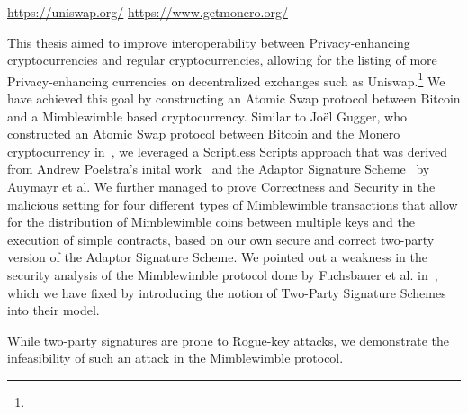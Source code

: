 \urldef{\urluniswp}\url{https://uniswap.org/}
\urldef{\urlmonero}\url{https://www.getmonero.org/}

This thesis aimed to improve interoperability between Privacy-enhancing cryptocurrencies and regular cryptocurrencies, allowing for the listing of more Privacy-enhancing currencies on decentralized exchanges such as Uniswap.\footnote{\urluniswp}
We have achieved this goal by constructing an Atomic Swap protocol between Bitcoin and a Mimblewimble based cryptocurrency.
Similar to Joël Gugger, who constructed an Atomic Swap protocol between Bitcoin and the Monero cryptocurrency in~\cite{gugger2020bitcoin}, we leveraged a Scriptless Scripts approach that was derived from Andrew Poelstra's inital work~\cite{poelstra2017scriptless} and the Adaptor Signature Scheme~\cite{aumayr2020bitcoinchannels} by Auymayr et al.
We further managed to prove Correctness and Security in the malicious setting for four different types of Mimblewimble transactions that allow for the distribution of Mimblewimble coins between multiple keys and the execution of simple contracts, based on our own secure and correct two-party version of the Adaptor Signature Scheme.
We pointed out a weakness in the security analysis of the Mimblewimble protocol done by Fuchsbauer et al. in~\cite{fuchsbauer2019aggregate}, which we have fixed by introducing the notion of Two-Party Signature Schemes into their model.

While two-party signatures are prone to Rogue-key attacks, we demonstrate the infeasibility of such an attack in the Mimblewimble protocol.

